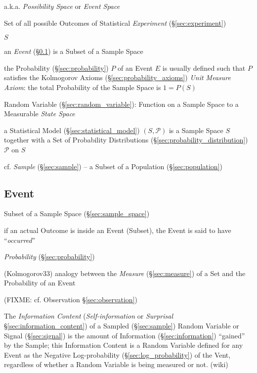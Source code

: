 a.k.a. \emph{Possibility Space} or \emph{Event Space}

Set of all possible Outcomes of Statistical \emph{Experiment}
(\S\ref{sec:experiment})

$S$

an \emph{Event} (\S\ref{sec:probability_event}) is a Subset of a Sample Space

the Probability (\S\ref{sec:probability}) $P$ of an Event $E$ is usually defined
such that $P$ satisfies the Kolmogorov Axioms (\S\ref{sec:probability_axioms})
\fist \emph{Unit Measure Axiom}: the total Probability of the Sample Space is
$1 = P(S)$

Random Variable (\S\ref{sec:random_variable}): Function on a Sample Space to a
Measurable \emph{State Space}

a Statistical Model (\S\ref{sec:statistical_model}) $(S,\mathcal{P})$ is a
Sample Space $S$ together with a Set of Probability Distributions
(\S\ref{sec:probability_distribution}) $\mathcal{P}$ on $S$

\fist cf. \emph{Sample} (\S\ref{sec:sample}) -- a Subset of a Population
(\S\ref{sec:population})



\subsection{Event}\label{sec:probability_event}

Subset of a Sample Space (\S\ref{sec:sample_space})

if an actual Outcome is inside an Event (Subset), the Event is said to have
``\emph{occurred}''

\emph{Probability} (\S\ref{sec:probability})

(Kolmogorov33) analogy between the \emph{Measure} (\S\ref{sec:measure}) of a Set
and the Probability of an Event

(FIXME: cf. Observation \S\ref{sec:observation})

The \emph{Information Content} (\emph{Self-information} or \emph{Surprisal}
\S\ref{sec:information_content}) of a Sampled (\S\ref{sec:sample}) Random
Variable or Signal (\S\ref{sec:signal}) is the amount of Information
(\S\ref{sec:information}) ``gained'' by the Sample; this Information Content is
a Random Variable defined for any Event as the Negative Log-probability
(\S\ref{sec:log_probability}) of the Vent, regardless of whether a Random
Variable is being measured or not. (wiki)



